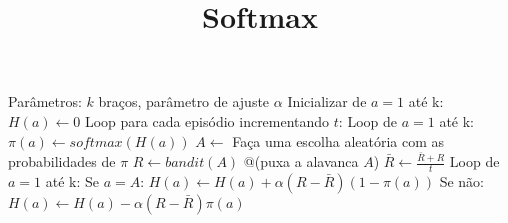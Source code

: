 \documentclass[brazilian,preview]{standalone}
\title{Softmax}
\begin{document}
\begin{algorithm}
Parâmetros: $k$ braços, parâmetro de ajuste $\alpha$ 
Inicializar de $a=1$ até k:
    $H(a) \leftarrow 0$ 
Loop para cada episódio incrementando $t$:
    Loop de $a=1$ até k:
        $\pi(a) \leftarrow softmax(H(a))$ 
    $A \leftarrow$ Faça uma escolha aleatória com as probabilidades de $\pi$ 
    $R \leftarrow bandit(A)$ @\hfill@ (puxa a alavanca $A$)
    $\bar{R} \leftarrow \frac{\bar{R} + R}{t}$
    Loop de $a=1$ até k:
      Se $a = A$:
        $H(a) \leftarrow H(a) + \alpha(R - \bar{R})(1 - \pi(a))$
      Se não:
        $H(a) \leftarrow H(a) - \alpha(R - \bar{R})\pi(a)$
\end{algorithm}
\end{document}
